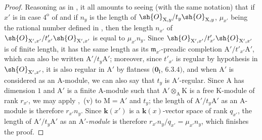 \begin{proof}
Reasoning as in , it all amounts to seeing (with the same notation) that if $x'$ is in case $4^{\mathrm{o}}$ of  and if $n_y$ is the length of $\sh{O}_{\mathrm{X},y}/t_y\sh{O}_{\mathrm{X},y}$, $\mu_{x'}$ being the rational number defined in , then the length $n_{x'}$ of $\sh{O}_{\mathrm{X}',x'}/t'_{x'}\sh{O}_{\mathrm{X}',x'}$ is equal to $\mu_{x'}n_y$.
Since $\sh{O}_{\mathrm{X}',x'}/t'_{x'}\sh{O}_{\mathrm{X}',x'}$ is of finite length, it has the same length as its $\mathfrak{m}_{x'}$-preadic completion $\mathrm{A}'/t'_{x'}\mathrm{A}'$, which can also be written $\mathrm{A}'/t_y\mathrm{A}'$; moreover, since $t'_{x'}$ is regular by hypothesis in $\sh{O}_{\mathrm{X}',x'}$, it is also regular in $\mathrm{A}'$ by flatness $(\mathbf{0}_{\mathrm{I}}$, $6.3.4)$, and when $\mathrm{A}'$ is considered as an A-module, we can also say that $t_y$ is $\mathrm{A}'$-regular.
Since $\mathrm{A}$ has dimension $1$ and $\mathrm{A}'$ is a finite $\mathrm{A}$-module such that $\mathrm{A}'\otimes_{\mathrm{A}}\mathrm{K}$ is a free $\mathrm{K}$-module of rank $r_{x'}$, we may apply ,{}~(v) to $\mathrm{M}=\mathrm{A}'$ and $t_y$; the length of $\mathrm{A}'/t_y\mathrm{A}'$ as an $\mathrm{A}$-module is therefore $r_{x'}n_y$.
Since $\boldsymbol{k}(x')$ is a $\boldsymbol{k}(x)$-vector space of rank $q_{x'}$, the length of $\mathrm{A}'/t_y\mathrm{A}'$ as an $\mathrm{A}'$-\emph{module} is therefore $r_{x'}n_y/q_{x'}=\mu_{x'}n_y$, which finishes the proof.
\end{proof}

